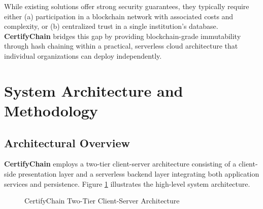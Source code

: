\documentclass[10pt,twocolumn,a4paper]{article}
\newcommand{\certifychain}{\textbf{CertifyChain}}
\begin{document}
While existing solutions offer strong security guarantees, they typically require either (a) participation in a blockchain network with associated costs and complexity, or (b) centralized trust in a single institution's database. \certifychain{} bridges this gap by providing blockchain-grade immutability through hash chaining within a practical, serverless cloud architecture that individual organizations can deploy independently.

\section{System Architecture and Methodology}

\subsection{Architectural Overview}

\certifychain{} employs a two-tier client-server architecture consisting of a client-side presentation layer and a serverless backend layer integrating both application services and persistence. Figure \ref{fig:architecture} illustrates the high-level system architecture.

\begin{figure}[H]
    \centering
    \caption{CertifyChain Two-Tier Client-Server Architecture}
    \label{fig:architecture}
\end{figure}
\end{document}
